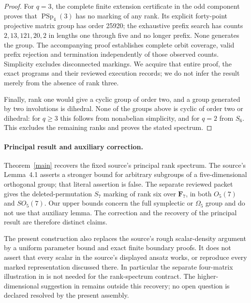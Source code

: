 \documentclass[11pt,a4paper]{article}
\newcommand{\PSp}{\operatorname{PSp}}
\newcommand{\Om}{\Omega}
\begin{document}
\begin{proof}
For $q=3$, the complete finite extension certificate in the odd
component proves that $\PSp_4(3)$ has no marking of any rank.
Its explicit forty-point projective matrix group has order 25920;
the exhaustive prefix search has counts $2,13,121,20,2$ in lengths
one through five and no longer prefix. None generates the group.
The accompanying proof establishes complete orbit coverage, valid
prefix rejection and termination independently of those observed
counts. Simplicity excludes disconnected markings. We acquire that
entire proof, the exact programs and their reviewed execution records;
we do not infer the result merely from the absence of rank three.

Finally, rank one would give a cyclic group of order two, and a group
generated by two involutions is dihedral. None of the groups above
is cyclic of order two or dihedral: for $q\ge3$ this follows from
nonabelian simplicity, and for $q=2$ from $S_6$. This excludes the
remaining ranks and proves the stated spectrum.
\end{proof}

\paragraph{Principal result and auxiliary correction.}
Theorem~\ref{main} recovers the fixed source's principal rank spectrum.
The source's Lemma~4.1 asserts a stronger bound for arbitrary subgroups
of a five-dimensional orthogonal group; that literal assertion is
false. The separate reviewed packet gives the deleted-permutation
$S_7$ marking of rank six over $\mathbf F_7$, in both $O_5(7)$ and $SO_5(7)$. Our upper bounds
concern the full symplectic or $\Om_5$ group and do not use that
auxiliary lemma. The correction and the recovery of the principal
result are therefore distinct claims.

The present construction also replaces the source's rough scalar-density
argument by a uniform parameter bound and exact finite boundary proofs.
It does not assert that every scalar in the source's displayed ansatz
works, or reproduce every marked representation discussed there. In
particular the separate four-matrix illustration in \cite[\S5.3]{B}
is not needed for the rank-spectrum contract. The higher-dimensional
suggestion in \cite[\S5.2]{B} remains outside this recovery; no open
question is declared resolved by the present assembly.
\end{document}

